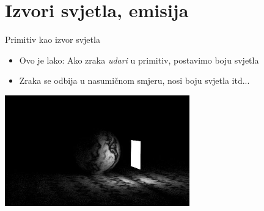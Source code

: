 \documentclass[9pt]{beamer}
\begin{document}
\section{Izvori svjetla, emisija}

\begin{frame}{Primitiv kao izvor svjetla}
	\begin{itemize}
		\item Ovo je lako: Ako zraka \textit{udari} u primitiv, postavimo boju svjetla
		\item Zraka se odbija u nasumičnom smjeru, nosi boju svjetla itd...
	\end{itemize}
	\begin{center}
		\includegraphics[width=0.6\textwidth]{slike/img.rect-light.jpg}
	\end{center}
\end{frame}


\end{document}
